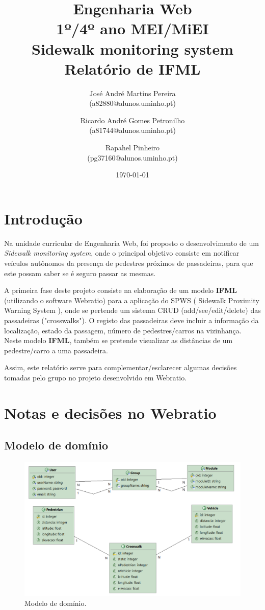 \documentclass[11pt,a4paper]{report}%
\title{Engenharia Web\\
        1º/4º ano MEI/MiEI\\
       \textbf{Sidewalk monitoring system }\\ Relatório de IFML
       } %
\author{José André Martins Pereira\\ (a82880@alunos.uminho.pt) \and Ricardo André Gomes Petronilho \\ (a81744@alunos.uminho.pt) \and  Rapahel Pinheiro \\ (pg37160@alunos.uminho.pt) 
       } %
\date{\today} %
\begin{document}

\maketitle %

\section{Introdução}
\hspace{5mm} Na unidade curricular de Engenharia Web, foi proposto o desenvolvimento de um \textit{Sidewalk monitoring system}, onde o principal objetivo consiste em notificar veículos autônomos da presença de pedestres próximos de passadeiras, para que este possam saber se é seguro passar as mesmas.

\hspace{5mm} A primeira fase deste projeto consiste na elaboração de um modelo \textbf{IFML} (utilizando o software Webratio) para a aplicação do SPWS ( Sidewalk Proximity Warning System ), onde se pertende um sistema CRUD (add/see/edit/delete) das passadeiras ("crosswalks"). O registo das passadeiras deve incluir a informação da localização, estado da passagem, número de pedestres/carros na vizinhança. Neste modelo \textbf{IFML}, também se pretende visualizar as distâncias de um pedestre/carro a uma passadeira.

\hspace{5mm} Assim, este relatório serve para complementar/esclarecer algumas decisões tomadas pelo grupo no projeto desenvolvido em Webratio.

\section{Notas e decisões no Webratio}

\subsection{Modelo de domínio}

\begin{figure}[H]
    \centering
    \includegraphics[scale=0.6]{modelo-de-dominio.png}
    \caption{Modelo de domínio.}
    \label{fig:mod_dom}
\end{figure}
\end{document}
